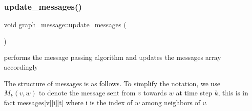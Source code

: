 \mbox{\label{classgraph__message_a611832eb2767873fbff7b07c5790570d}} 
\subsubsection{\texorpdfstring{update\+\_\+messages()}{update\_messages()}}
{\footnotesize\ttfamily void graph\+\_\+message\+::update\+\_\+messages (\begin{DoxyParamCaption}{ }\end{DoxyParamCaption})}



performs the message passing algorithm and updates the messages array accordingly 

The structure of messages is as follows. To simplify the notation, we use $M_k(v,w)$ to denote the message sent from $v$ towards $w$ at time step $k$, this is in fact messages\mbox{[}v\mbox{]}\mbox{[}i\mbox{]}\mbox{[}t\mbox{]} where i is the index of $w$ among neighbors of $v$.


